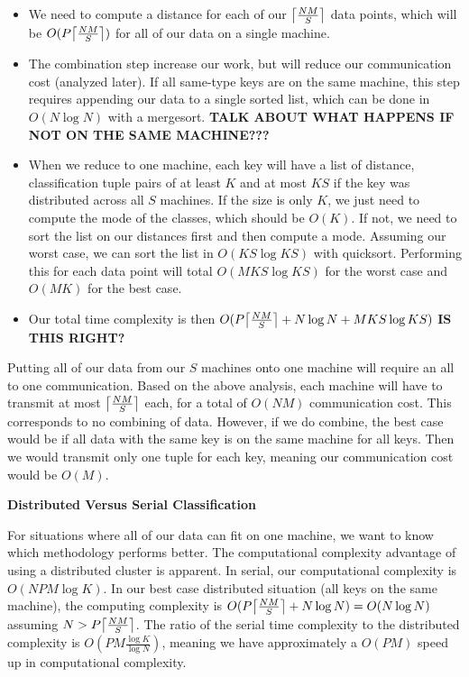\begin{itemize}
\item We need to compute a distance for each of our $\ceil*{\frac{N M}{S}}$ 
data points, which will be $O(P \ceil*{\frac{N M}{S}})$ for all of our data on 
a single machine. 
\item The combination step increase our work, but will reduce our communication 
cost (analyzed later). If all same-type keys are on the same machine, this 
step requires appending our data to a single sorted list, which can be done in 
$O(N \log N)$ with a mergesort.
\textbf{TALK ABOUT WHAT HAPPENS IF NOT ON THE SAME MACHINE???}
\item When we reduce to one machine, each key will have a list of distance, 
classification tuple pairs of at least $K$ and at most $K S$ if the key was 
distributed across all $S$ machines. If the size is only $K$, we just need to 
compute the mode of the classes, which should be $O(K)$. If not, we need to 
sort the list on our distances first and then compute a mode. Assuming our 
worst case, we can sort the list in $O(K S \log K S)$ with quicksort. 
Performing this for each data point will total $O(M K S \log K S)$ for the 
worst case and $O(M K)$ for the best case.
\item Our total time complexity is then 
$O(P \ceil*{\frac{N M}{S}} + N \log N + M K S \log K S)$ \textbf{IS THIS RIGHT?}
\end{itemize}

\vspace{5 mm}
\noindent
Putting all of our data from our $S$ machines onto one machine will require an 
all to one communication. Based on the above analysis, each machine will have 
to transmit at most $\ceil*{\frac{N M}{S}}$ each, for a total of $O(N M)$ 
communication cost. This corresponds to no combining of data. However, if we do 
combine, the best case would be if all data with the same key is on the same 
machine for all keys. Then we would transmit only one tuple for each key, 
meaning our communication cost would be $O(M)$.

\vspace{5 mm}
\noindent
\textbf{Distributed Versus Serial Classification}

\vspace{5 mm}
\noindent
For situations where all of our data can fit on one machine, we want to know 
which methodology performs better. The computational complexity advantage of 
using a distributed cluster is apparent. In serial, our computational 
complexity is $O(N P M \log K)$. In our best case distributed situation (all 
keys on the same machine), the computing complexity is 
$O(P \ceil*{\frac{N M}{S}} + N \log N) = O(N \log N)$ assuming 
$N > P \ceil*{\frac{N M}{S}}$. The ratio of the serial time complexity to the 
distributed complexity is $O(P M \frac{\log K}{\log N})$, meaning we have 
approximately a $O(P M)$ speed up in computational complexity.


